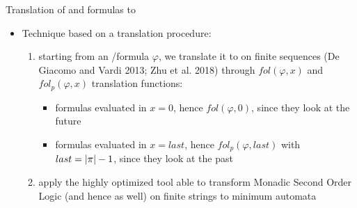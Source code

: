\documentclass[10pt]{beamer}
\begin{document}
\begin{frame}{Translation of \LTLf and \PLTL formulas to \DFA}
	\begin{itemize}
		\item Technique based on a translation procedure:
		\vspace{0.3cm}
		\begin{enumerate}
		\item starting from an \LTLf/\PLTL formula $\varphi$, we translate it to \FOL on finite sequences (De Giacomo and Vardi 2013; Zhu et al. 2018) through $fol(\varphi, x)$ and $fol_p(\varphi, x)$ translation functions:
	\begin{itemize}
	\item \LTLf formulas evaluated in $x = 0$, hence $fol(\varphi, 0)$, since they look at the future
	\item \PLTL formulas evaluated in $x = last$, hence $fol_p(\varphi, last)$ with $last = | \pi | - 1$, since they look at the past
	\end{itemize}
	\vspace{0.3cm}
		\item apply the highly optimized tool \MONA able to transform Monadic Second Order Logic (and hence \FOL as well) on finite strings to minimum \DFA automata		
		\end{enumerate}
	\end{itemize}
	
\end{frame}
\end{document}
